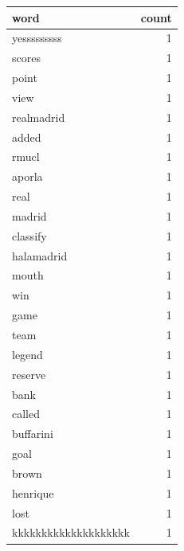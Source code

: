 \begin{tabular}{lr}
\toprule
word & count \\
\midrule
yesssssssss & 1 \\
scores & 1 \\
point & 1 \\
view & 1 \\
realmadrid & 1 \\
added & 1 \\
rmucl & 1 \\
aporla & 1 \\
real & 1 \\
madrid & 1 \\
classify & 1 \\
halamadrid & 1 \\
mouth & 1 \\
win & 1 \\
game & 1 \\
team & 1 \\
legend & 1 \\
reserve & 1 \\
bank & 1 \\
called & 1 \\
buffarini & 1 \\
goal & 1 \\
brown & 1 \\
henrique & 1 \\
lost & 1 \\
kkkkkkkkkkkkkkkkkkkk & 1 \\
\bottomrule
\end{tabular}
